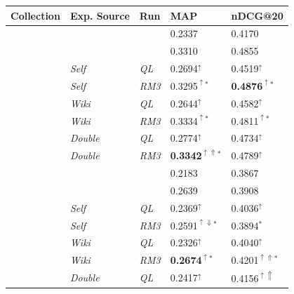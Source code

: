 \documentclass{article}
\begin{document}
\begin{table}[htbp]
\centering
\begin{tabular}{|c|l|l|l|l|} \hline
{\bf Collection} & {\bf Exp. Source} & {\bf Run} & {\bf MAP} & {\bf nDCG@20} \\ \hline\hline
\rule{0pt}{2.5ex} \multirow{7}{*}{AP} & \cellcolor{gray!50}{\it Baseline} & \cellcolor{gray!50}{\it QL} & \cellcolor{gray!50}0.2337 & \cellcolor{gray!50}0.4170 \\ \cline{2-5}
\rule{0pt}{2.5ex} & \cellcolor{gray!50}{\it Baseline} & \cellcolor{gray!50}{\it RM3} & \cellcolor{gray!50}0.3310 & \cellcolor{gray!50}0.4855 \\ \cline{2-5}
\rule{0pt}{2.5ex} & {\it Self} & {\it QL} & 0.2694$^\uparrow$ & 0.4519$^\uparrow$ \\ \cline{2-5}
\rule{0pt}{2.5ex} & {\it Self} & {\it RM3} & 0.3295$^{\uparrow *}$ & \textbf{0.4876}$^{\uparrow *}$ \\ \cline{2-5}
\rule{0pt}{2.5ex} & {\it Wiki} & {\it QL} & 0.2644$^\uparrow$ & 0.4582$^\uparrow$ \\ \cline{2-5}
\rule{0pt}{2.5ex} & {\it Wiki} & {\it  RM3} & 0.3334$^{\uparrow *}$ & 0.4811$^{\uparrow *}$ \\ \cline{2-5}
\rule{0pt}{2.5ex} & {\it Double} & {\it QL} & 0.2774$^\uparrow$ & 0.4734$^\uparrow$ \\ \cline{2-5}
\rule{0pt}{2.5ex} & {\it Double} & {\it RM3} & \textbf{0.3342}$^{\uparrow\Uparrow *}$ & 0.4789$^\uparrow$ \\ \hline\hline
\rule{0pt}{2.5ex} \multirow{7}{*}{Robust} & \cellcolor{gray!50}{\it Baseline} & \cellcolor{gray!50}{\it QL} & \cellcolor{gray!50}0.2183 & \cellcolor{gray!50}0.3867 \\ \cline{2-5}
\rule{0pt}{2.5ex} & \cellcolor{gray!50}{\it Baseline} & \cellcolor{gray!50}{\it RM3} & \cellcolor{gray!50}0.2639 & \cellcolor{gray!50}0.3908 \\ \cline{2-5}
\rule{0pt}{2.5ex} & {\it Self} & {\it QL} & 0.2369$^\uparrow$ & 0.4036$^\uparrow$ \\ \cline{2-5}
\rule{0pt}{2.5ex} & {\it Self} & {\it RM3} & 0.2591$^{\uparrow\Downarrow *}$ & 0.3894$^{*}$ \\ \cline{2-5}
\rule{0pt}{2.5ex} & {\it Wiki} & {\it QL} & 0.2326$^\uparrow$ & 0.4040$^\uparrow$ \\ \cline{2-5}
\rule{0pt}{2.5ex} & {\it Wiki} & {\it RM3} & \textbf{0.2674}$^{\uparrow *}$ & 0.4201$^{\uparrow\Uparrow *}$ \\ \cline{2-5}
\rule{0pt}{2.5ex} & {\it Double} & {\it QL} & 0.2417$^\uparrow$ & 0.4156$^{\uparrow\Uparrow}$ \\ \cline{2-5}

\end{tabular}
\end{table}
\end{document}
